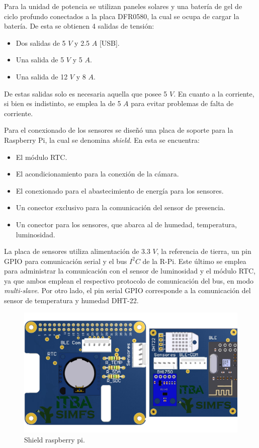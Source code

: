 
Para la unidad de potencia se utilizan paneles solares y una batería de gel de ciclo profundo conectados a la placa DFR0580, la cual se ocupa de cargar la batería. De esta se obtienen 4 salidas de tensión:
\begin{itemize}
	\item Dos salidas de 5 $V$ y 2.5 $A$ [USB].
	\item Una salida de 5 $V$ y 5 $A$.
	\item Una salida de 12 $V$ y 8 $A$.
\end{itemize}
De estas salidas solo es necesaria aquella que posee 5 $V$. En cuanto a la corriente, si bien es indistinto, se emplea la de 5 $A$ para evitar problemas de falta de corriente.

Para el conexionado de los sensores se diseñó una placa de soporte para la Raspberry Pi, la cual se denomina \textit{shield}. En esta se encuentra:
\begin{itemize}
	\item El módulo RTC.
	\item El acondicionamiento para la conexión de la cámara.
	\item El conexionado para el abastecimiento de energía para los sensores.
	\item Un conector exclusivo para la comunicación del sensor de presencia.
	\item Un conector para los sensores, que abarca al de humedad, temperatura, luminosidad.
\end{itemize}

La placa de sensores utiliza alimentación de 3.3 $V$, la referencia de tierra, un pin GPIO para comunicación serial y el bus $I^2C$ de la R-Pi. Este último se emplea para administrar la comunicación con el sensor de luminosidad y el módulo RTC, ya que ambos emplean el respectivo protocolo de comunicación del bus, en modo \textit{multi-slave}. Por otro lado, el pin serial GPIO corresponde a la comunicación del sensor de temperatura y humedad DHT-22. 
\begin{figure}[H]
	\centering
	\includegraphics[width=0.9\linewidth,page=1]{ImagenesIngenieria de Detalle/RPI}		
	\caption{Shield raspberry pi.}
	\label{fig:conexionado_Rpi}
\end{figure}

